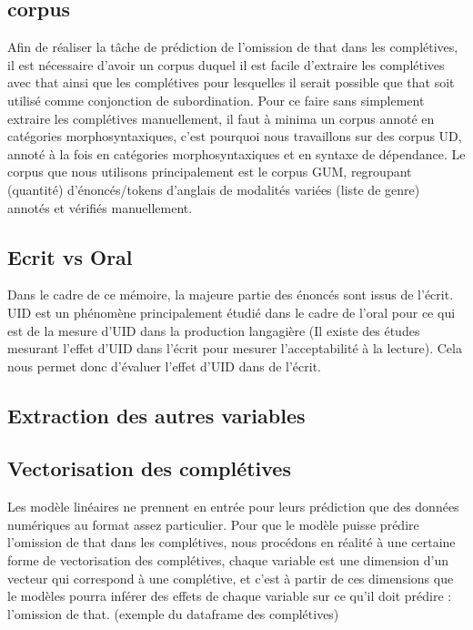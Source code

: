\documentclass{article}
\begin{document}
\subsection{corpus}
Afin de réaliser la tâche de prédiction de l'omission de that dans les complétives, il est nécessaire d'avoir un corpus duquel il est facile d'extraire les complétives avec that ainsi que les complétives pour lesquelles il serait possible que that soit utilisé comme conjonction de subordination. Pour ce faire sans simplement extraire les complétives manuellement, il faut à minima un corpus annoté en catégories morphosyntaxiques, c'est pourquoi nous travaillons sur des corpus UD, annoté à la fois en catégories morphosyntaxiques et en syntaxe de dépendance. Le corpus que nous utilisons principalement est le corpus GUM, regroupant (quantité) d'énoncés/tokens d'anglais de modalités variées (liste de genre) annotés et vérifiés manuellement. 

\subsection{Ecrit vs Oral}
Dans le cadre de ce mémoire, la majeure partie des énoncés sont issus de l'écrit. UID est un phénomène principalement étudié dans le cadre de l'oral pour ce qui est de la mesure d'UID dans la production langagière (Il existe des études mesurant l'effet d'UID dans l'écrit pour mesurer l'acceptabilité à la lecture). Cela nous permet donc d'évaluer l'effet d'UID dans de l'écrit.

\subsection{Extraction des autres variables}

\subsection{Vectorisation des complétives}
Les modèle linéaires ne prennent en entrée pour leurs prédiction que des données numériques au format assez particulier. Pour que le modèle puisse prédire l'omission de that dans les complétives, nous procédons en réalité à une certaine forme de vectorisation des complétives, chaque variable est une dimension d'un vecteur qui correspond à une complétive, et c'est à partir de ces dimensions que le modèles pourra inférer des effets de chaque variable sur ce qu'il doit prédire : l'omission de that. (exemple du dataframe des complétives)
\end{document}
